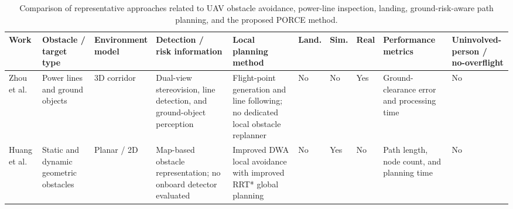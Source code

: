\documentclass[electronics,article,submit,moreauthors]{Definitions/mdpi}
\DeclareRobustCommand{\added}[1]{#1}%
\DeclareRobustCommand{\added}[1]{\textcolor{green!50!black}{#1}}
\def\added#1{#1}%
\begin{document}
\begin{table}[tbp]
\caption{Comparison of representative approaches related to UAV obstacle avoidance, power-line inspection, \added{landing, }ground-risk-aware path planning, and the proposed PORCE method.}
\label{tab:related_work_comparison}

\centering
\fontsize{7.2}{8.2}\selectfont
\setlength{\tabcolsep}{1.2pt}
\renewcommand{\arraystretch}{1.12}

\begin{tabularx}{\linewidth}{
>{\raggedright\arraybackslash}p{1.05cm}
>{\raggedright\arraybackslash}p{1.20cm}
>{\centering\arraybackslash}p{1.10cm}
>{\raggedright\arraybackslash}X
>{\raggedright\arraybackslash}X
>{\centering\arraybackslash}p{0.52cm}
>{\centering\arraybackslash}p{0.48cm}
>{\centering\arraybackslash}p{0.48cm}
>{\raggedright\arraybackslash}X
>{\raggedright\arraybackslash}X
}

\toprule

\textbf{Work} &
\shortstack{\textbf{Obstacle /}\\\textbf{target type}} &
\shortstack{\textbf{Environment}\\\textbf{model}} &
\shortstack{\textbf{Detection /}\\\textbf{risk information}} &
\shortstack{\textbf{Local planning}\\\textbf{method}} &
\added{\textbf{Land.}} &
\textbf{Sim.} &
\textbf{Real} &
\shortstack{\textbf{Performance}\\\textbf{metrics}} &
\shortstack{\textbf{Uninvolved-person /}\\\textbf{no-overflight}} \\

\midrule

Zhou et al. \cite{zhou2022dualview} &
Power lines and ground objects &
3D corridor &
Dual-view stereovision, line detection, and ground-object perception &
Flight-point generation and line following; no dedicated local obstacle replanner &
\added{No} &
No &
Yes &
Ground-clearance error and processing time &
No \\

\addlinespace[2pt]

Huang et al. \cite{huang2025hybrid} &
Static and dynamic geometric obstacles &
Planar / 2D &
Map-based obstacle representation; no onboard detector evaluated &
Improved DWA local avoidance with improved RRT* global planning &
\added{No} &
Yes &
No &
Path length, node count, and planning time &
No \\


\end{tabularx}
\end{table}
\end{document}
